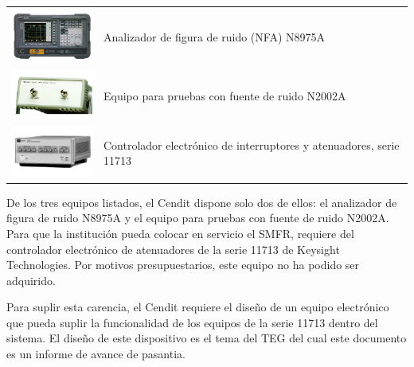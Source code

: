 \documentclass[paper=letter,oneside,fontsize=11pt, parskip=full]{scrartcl}
\begin{document}
	\begin{table}[h!]
		\begin{tabular}{p{3cm}l}
			\begin{minipage}{3cm}
				\includegraphics[width=3cm]{Imagenes/N8975A.pdf}
			\end{minipage} &
			Analizador de figura de ruido (NFA) N8975A \\

			\begin{minipage}{3cm}
				\includegraphics[width=3cm]{Imagenes/N2002A.pdf}
			\end{minipage} &
			Equipo para pruebas con fuente de ruido N2002A \\
			
			\begin{minipage}{3cm}
				\includegraphics[width=3cm]{Imagenes/11713A.pdf}
			\end{minipage} &			
			Controlador electrónico de interruptores y atenuadores, serie 11713 
		\end{tabular}
	\end{table}

	De los tres equipos listados, el Cendit dispone solo dos de ellos: el analizador de figura de ruido N8975A y el equipo para pruebas con fuente de ruido N2002A. Para que la institución pueda colocar en servicio el SMFR, requiere del controlador electrónico de atenuadores de la serie 11713 de Keysight Technologies. Por motivos presupuestarios, este equipo no ha podido ser adquirido.
	
	Para suplir esta carencia, el Cendit requiere el diseño de un equipo electrónico que pueda suplir la funcionalidad de los equipos de la serie 11713 dentro del sistema. El diseño de este dispositivo es el tema del TEG del cual este documento es un informe de avance de pasantia.
	
\end{document}

